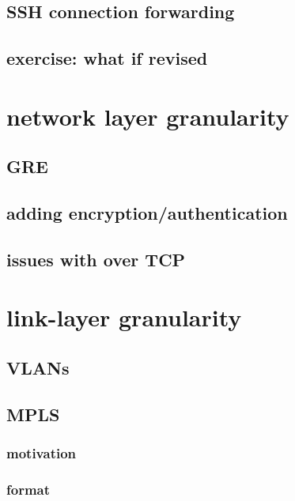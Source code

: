 \subsection{SSH connection forwarding}


\subsection{exercise: what if revised}


\section{network layer granularity}




\subsection{GRE}



\subsection{adding encryption/authentication}


\subsection{issues with over TCP}


\section{link-layer granularity}

\subsection{VLANs}



\subsection{MPLS}

\subsubsection{motivation}

\subsubsection{format}
